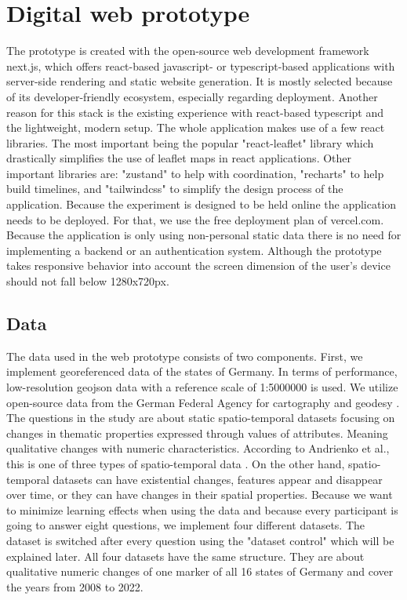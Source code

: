 \chapter{Digital web prototype}
The prototype is created with the open-source web development framework next.js, which offers react-based javascript- or
typescript-based applications with server-side rendering and static website generation. It is mostly selected because of its
developer-friendly ecosystem, especially regarding deployment. Another reason for this stack is the existing experience
with react-based typescript and the lightweight, modern setup. The whole application makes use of a few react libraries.
The most important being the popular "react-leaflet" library which drastically simplifies the use of leaflet maps in react
applications. Other important libraries are: "zustand" to help with coordination, "recharts" to help build timelines, and
"tailwindcss" to simplify the design process of the application. Because the experiment is designed to be held online the
application needs to be deployed. For that, we use the free deployment plan of vercel.com. Because the application is only
using non-personal static data there is no need for implementing a backend or an authentication system. Although the prototype
takes responsive behavior into account the screen dimension of the user's device should not fall below 1280x720px. 
\section{Data} \label{dataSection}
The data used in the web prototype consists of two components. First, we implement georeferenced data of the states of Germany. In terms of
performance, low-resolution geojson data with a reference scale of 1:5000000 is used. We utilize open-source data
from the German Federal Agency for cartography and geodesy \citep*{gdz.bkg}. The questions in the study are about static
spatio-temporal datasets focusing on changes in thematic properties expressed through values of attributes. Meaning
qualitative changes with numeric characteristics. According to Andrienko et al., this is one of three types of spatio-temporal
data \citep*{Andrienko.2003}. On the other hand, spatio-temporal datasets can have existential changes, features appear and
disappear over time, or they can have changes in their spatial properties. Because we want to minimize learning effects
when using the data and because every participant is going to answer eight questions, we implement four different
datasets. The dataset is switched after every question using the "dataset control" which will be explained later. All four datasets
have the same structure. They are about qualitative numeric changes of one marker of all 16 states of Germany and cover
the years from 2008 to 2022.
